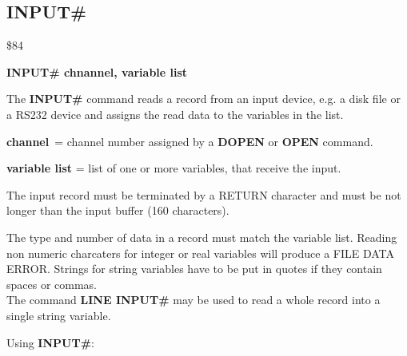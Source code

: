 
\newpage
\subsection{INPUT\#}
\begin{description}[leftmargin=3cm,style=nextline]
\item [Token:] \$84
\item [Format:] {\bf INPUT\# chnannel, variable list}
\item [Usage:] The {\bf INPUT\#} command reads a record
               from an input device, e.g. a disk file
               or a RS232 device and assigns the read data
               to the variables in the list.

               {\bf channel} = channel number assigned
               by a {\bf DOPEN} or {\bf OPEN} command.

               {\bf variable list} = list of one or more
               variables, that receive the input.

               The input record must be terminated by a
               RETURN character and must be not longer than
               the input buffer (160 characters).

\item [Remarks:] The type and number of data in a record must
               match the variable list.
               Reading non numeric charcaters for integer or real
               variables will produce a FILE DATA ERROR.
               Strings for string variables have to be put in quotes
               if they contain spaces or commas. \\
               The command {\bf LINE INPUT\#} may be used to
               read a whole record into a single string variable.

\item [Example:] Using {\bf INPUT\#}:
\end{description}


\newpage
